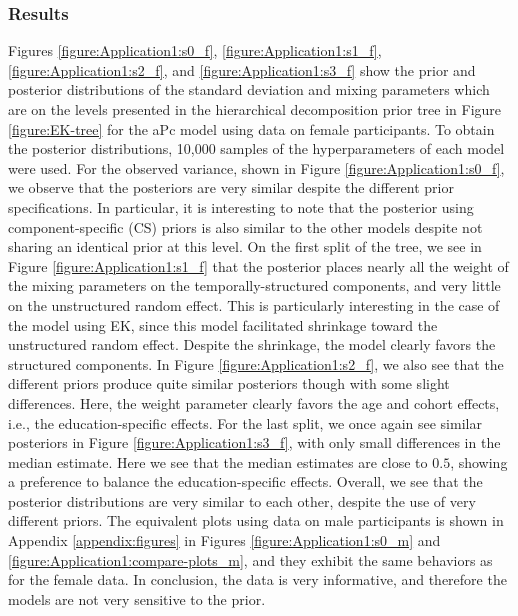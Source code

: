 \FloatBarrier
\subsubsection{Results}
\label{section:application1:prior-sens-result}
Figures \ref{figure:Application1:s0_f}, \ref{figure:Application1:s1_f}, \ref{figure:Application1:s2_f}, and \ref{figure:Application1:s3_f} show the prior and posterior distributions of the standard deviation and mixing parameters which are on the levels presented in the hierarchical decomposition prior tree in Figure \ref{figure:EK-tree} for the aPc model using data on female participants. To obtain the posterior distributions, 10,000 samples of the hyperparameters of each model were used. For the observed variance, shown in Figure \ref{figure:Application1:s0_f}, we observe that the posteriors are very similar despite the different prior specifications. In particular, it is interesting to note that the posterior using component-specific (CS) priors is also similar to the other models despite not sharing an identical prior at this level. On the first split of the tree, we see in Figure \ref{figure:Application1:s1_f} that the posterior places nearly all the weight of the mixing parameters on the temporally-structured components, and very little on the unstructured random effect. This is particularly interesting in the case of the model using EK, since this model facilitated shrinkage toward the unstructured random effect. Despite the shrinkage, the model clearly favors the structured components. In Figure \ref{figure:Application1:s2_f}, we also see that the different priors produce quite similar posteriors though with some slight differences. Here, the weight parameter clearly favors the age and cohort effects, i.e., the education-specific effects. For the last split, we once again see similar posteriors in Figure \ref{figure:Application1:s3_f}, with only small differences in the median estimate. Here we see that the median estimates are close to $0.5$, showing a preference to balance the education-specific effects. Overall, we see that the posterior distributions are very similar to each other, despite the use of very different priors. The equivalent plots using data on male participants is shown in Appendix \ref{appendix:figures} in Figures \ref{figure:Application1:s0_m} and \ref{figure:Application1:compare-plots_m}, and they exhibit the same behaviors as for the female data. In conclusion, the data is very informative, and therefore the models are not very sensitive to the prior.

